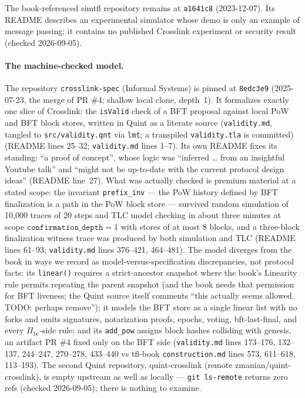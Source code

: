 \documentclass[11pt,a4paper]{article}
\theoremstyle{definition}
\begin{document}
The book-referenced \textsf{simtfl} repository remains at
\texttt{a1641c8} (2023-12-07). Its README describes an experimental
simulator whose demo is only an example of message passing; it contains no
published Crosslink experiment or security result (checked 2026-09-05).

\paragraph{The machine-checked model.} The repository
\texttt{crosslink-spec} (Informal Systems) is pinned at
\texttt{8edc3e9} (2025-07-23, the merge of PR \#4; shallow local clone,
depth~1).
It formalizes exactly one slice of Crosslink: the \texttt{isValid} check
of a BFT proposal against local PoW and BFT block stores, written in
Quint as a literate source (\texttt{validity.md}, tangled to
\texttt{src/validity.qnt} via \texttt{lmt}; a transpiled
\texttt{validity.tla} is committed) (README lines 25--32;
\texttt{validity.md} lines 1--7). Its own README fixes its standing: ``a
proof of concept'', whose logic was ``inferred \ldots{} from an
insightful Youtube talk'' and ``might not be up-to-date with the current
protocol design ideas'' (README line~27). What was actually checked is
premium material at a stated scope: the invariant \texttt{prefix\_inv}
--- the PoW history defined by BFT finalization is a path in the PoW
block store --- survived random simulation of 10{,}000 traces of 20
steps and TLC model checking in about three minutes at scope
$\texttt{confirmation\_depth}=1$ with stores of at most 8 blocks, and a
three-block finalization witness trace was produced by both simulation
and TLC (README lines 61--93; \texttt{validity.md} lines 376--421,
464--481). The model diverges from the book in ways we record as
model-versus-specification discrepancies, not protocol facts: its
\texttt{linear()} requires a strict-ancestor snapshot where the book's
Linearity rule permits repeating the parent snapshot (and the book needs
that permission for BFT liveness; the Quint source itself comments
``this actually seems allowed. TODO: perhaps remove''); it models the
BFT store as a single linear list with no forks and omits signatures,
notarization proofs, epochs, voting, bft-last-final, and every
$\Pi_{\mathrm{bc}}$-side rule; and its \texttt{add\_pow} assigns block
hashes colliding with genesis, an artifact PR \#4 fixed only on the BFT
side (\texttt{validity.md} lines 173--176, 132--137, 244--247, 270--278,
433--440 vs tfl-book \texttt{construction.md} lines 573, 611--618,
113--193). The second Quint repository, quint-crosslink (remote
zmanian/quint-crosslink), is empty upstream as well as locally ---
\texttt{git ls-remote} returns zero refs (checked 2026-09-05); there is
nothing to examine.
\end{document}
